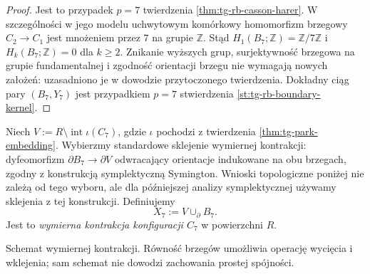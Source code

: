 \begin{proof}
Jest to przypadek $p=7$ twierdzenia
\ref{thm:tg-rb-casson-harer}.
W szczególności w jego modelu uchwytowym
komórkowy homomorfizm brzegowy
$C_2\to C_1$ jest mnożeniem przez $7$
na grupie $\mathbb Z$.
Stąd $H_1(B_7;\mathbb Z)=\mathbb Z/7\mathbb Z$
i $H_k(B_7;\mathbb Z)=0$ dla $k\geq2$.
Znikanie wyższych grup, surjektywność brzegowa
na grupie fundamentalnej i zgodność orientacji
brzegu nie wymagają nowych założeń:
uzasadniono je w dowodzie przytoczonego twierdzenia.
Dokładny ciąg pary $(B_7,Y_7)$ jest przypadkiem
$p=7$ stwierdzenia \ref{st:tg-rb-boundary-kernel}.
\end{proof}

\begin{definicja}[Rozmaitość $X_7$]
Niech $V:=R\setminus\operatorname{int}\iota(C_7)$,
gdzie $\iota$ pochodzi z twierdzenia
\ref{thm:tg-park-embedding}. Wybierzmy standardowe sklejenie wymiernej kontrakcji:
dyfeomorfizm $\partial B_7\to\partial V$ odwracający
orientacje indukowane na obu brzegach, zgodny
z konstrukcją symplektyczną Symington.
Wnioski topologiczne poniżej nie zależą od tego
wyboru, ale dla późniejszej analizy symplektycznej
używamy sklejenia z tej konstrukcji.
Definiujemy
\[
X_7:=V\cup_{\partial}B_7.
\]
Jest to \emph{wymierna kontrakcja konfiguracji $C_7$}
w powierzchni $R$.
\end{definicja}

\begin{center}

{\footnotesize Schemat wymiernej kontrakcji. Równość brzegów umożliwia
operację wycięcia i wklejenia; sam schemat nie dowodzi
zachowania prostej spójności.}
\end{center}

